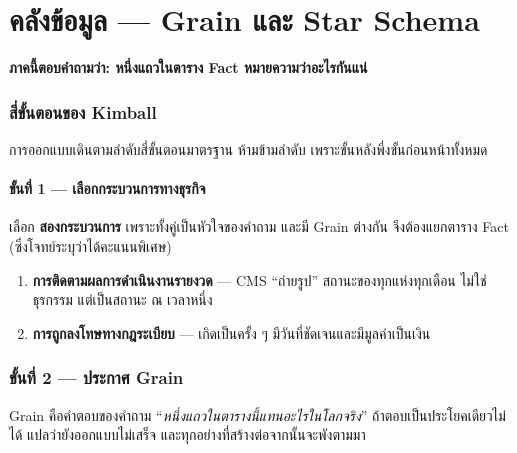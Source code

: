 \documentclass[11pt,a4paper]{article}
\begin{document}
\clearpage

\part{คลังข้อมูล — Grain และ Star Schema}

\textbf{ภาคนี้ตอบคำถามว่า: หนึ่งแถวในตาราง Fact หมายความว่าอะไรกันแน่}

\section{สี่ขั้นตอนของ Kimball}

การออกแบบเดินตามลำดับสี่ขั้นตอนมาตรฐาน ห้ามข้ามลำดับ เพราะขั้นหลังพึ่งขั้นก่อนหน้าทั้งหมด

\subsection{ขั้นที่ 1 --- เลือกกระบวนการทางธุรกิจ}
เลือก \textbf{สองกระบวนการ} เพราะทั้งคู่เป็นหัวใจของคำถาม และมี Grain ต่างกัน
จึงต้องแยกตาราง Fact (ซึ่งโจทย์ระบุว่าได้คะแนนพิเศษ)

\begin{enumerate}
\item \textbf{การติดตามผลการดำเนินงานรายงวด} --- CMS ``ถ่ายรูป'' สถานะของทุกแห่งทุกเดือน
      ไม่ใช่ธุรกรรม แต่เป็นสถานะ ณ เวลาหนึ่ง
\item \textbf{การถูกลงโทษทางกฎระเบียบ} --- เกิดเป็นครั้ง ๆ มีวันที่ชัดเจนและมีมูลค่าเป็นเงิน
\end{enumerate}

\section{ขั้นที่ 2 --- ประกาศ Grain}

\begin{keybox}[title={Grain คือประโยคเดียวที่ต้องเขียนให้ได้ก่อนทำอย่างอื่น}]
Grain คือคำตอบของคำถาม ``\emph{หนึ่งแถวในตารางนี้แทนอะไรในโลกจริง}''
ถ้าตอบเป็นประโยคเดียวไม่ได้ แปลว่ายังออกแบบไม่เสร็จ
และทุกอย่างที่สร้างต่อจากนั้นจะพังตามมา
\end{keybox}
\end{document}
